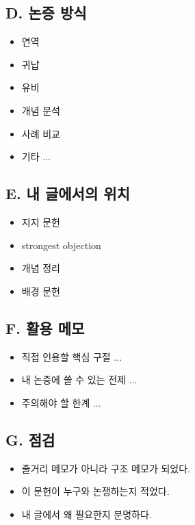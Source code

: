 \subsection{D. 논증 방식}\label{d-uxb17cuxc99d-uxbc29uxc2dd}

\begin{itemize}
\tightlist
\item[$\square$]
  연역
\item[$\square$]
  귀납
\item[$\square$]
  유비
\item[$\square$]
  개념 분석
\item[$\square$]
  사례 비교
\item[$\square$]
  기타 ...
\end{itemize}

\subsection{E. 내 글에서의 위치}\label{e-uxb0b4-uxae00uxc5d0uxc11cuxc758-uxc704uxce58}

\begin{itemize}
\tightlist
\item[$\square$]
  지지 문헌
\item[$\square$]
  strongest objection
\item[$\square$]
  개념 정리
\item[$\square$]
  배경 문헌
\end{itemize}

\subsection{F. 활용 메모}\label{f-uxd65cuxc6a9-uxba54uxbaa8}

\begin{itemize}
\tightlist
\item
  직접 인용할 핵심 구절 ...
\item
  내 논증에 쓸 수 있는 전제 ...
\item
  주의해야 할 한계 ...
\end{itemize}

\subsection{G. 점검}\label{g-uxc810uxac80}

\begin{itemize}
\tightlist
\item[$\square$]
  줄거리 메모가 아니라 구조 메모가 되었다.
\item[$\square$]
  이 문헌이 누구와 논쟁하는지 적었다.
\item[$\square$]
  내 글에서 왜 필요한지 분명하다.
\end{itemize}

